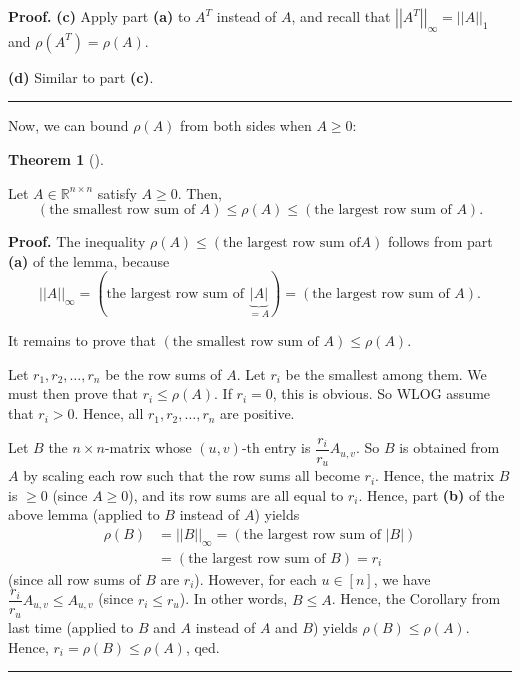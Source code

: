 \documentclass[numbers=enddot,12pt,final,onecolumn,notitlepage]{scrartcl}%
\numberwithin{exer}{subsection}
\theoremstyle{definition}
\newtheorem{theo}{Theorem}[subsection]
\newenvironment{theorem}[1][]
{\begin{theo}[#1]\begin{leftbar}}
{\end{leftbar}\end{theo}}
\newenvironment{proof}[1][Proof]{\noindent\textbf{#1.} }{\ \rule{0.5em}{0.5em}}
\begin{document}
\begin{proof}
\textbf{(c)} Apply part \textbf{(a)} to $A^{T}$ instead of $A$, and recall
that $\left\vert \left\vert A^{T}\right\vert \right\vert _{\infty}=\left\vert
\left\vert A\right\vert \right\vert _{1}$ and $\rho\left(  A^{T}\right)
=\rho\left(  A\right)  $.

\textbf{(d)} Similar to part \textbf{(c)}.
\end{proof}

Now, we can bound $\rho\left(  A\right)  $ from both sides when $A\geq0$:

\begin{theorem}
Let $A\in\mathbb{R}^{n\times n}$ satisfy $A\geq0$. Then,%
\[
\left(  \text{the smallest row sum of }A\right)  \leq\rho\left(  A\right)
\leq\left(  \text{the largest row sum of }A\right)  .
\]

\end{theorem}

\begin{proof}
The inequality $\rho\left(  A\right)  \leq\left(  \text{the largest row sum of
}A\right)  $ follows from part \textbf{(a)} of the lemma, because
\[
\left\vert \left\vert A\right\vert \right\vert _{\infty}=\left(  \text{the
largest row sum of }\underbrace{\left\vert A\right\vert }_{=A}\right)
=\left(  \text{the largest row sum of }A\right)  .
\]


It remains to prove that $\left(  \text{the smallest row sum of }A\right)
\leq\rho\left(  A\right)  $.

Let $r_{1},r_{2},\ldots,r_{n}$ be the row sums of $A$. Let $r_{i}$ be the
smallest among them. We must then prove that $r_{i}\leq\rho\left(  A\right)
$. If $r_{i}=0$, this is obvious. So WLOG assume that $r_{i}>0$. Hence, all
$r_{1},r_{2},\ldots,r_{n}$ are positive.

Let $B$ the $n\times n$-matrix whose $\left(  u,v\right)  $-th entry is
$\dfrac{r_{i}}{r_{u}}A_{u,v}$. So $B$ is obtained from $A$ by scaling each row
such that the row sums all become $r_{i}$. Hence, the matrix $B$ is $\geq0$
(since $A\geq0$), and its row sums are all equal to $r_{i}$. Hence, part
\textbf{(b)} of the above lemma (applied to $B$ instead of $A$) yields
\begin{align*}
\rho\left(  B\right)    & =\left\vert \left\vert B\right\vert \right\vert
_{\infty}=\left(  \text{the largest row sum of }\left\vert B\right\vert
\right)  \\
& =\left(  \text{the largest row sum of }B\right)  =r_{i}%
\end{align*}
(since all row sums of $B$ are $r_{i}$). However, for each $u\in\left[
n\right]  $, we have $\dfrac{r_{i}}{r_{u}}A_{u,v}\leq A_{u,v}$ (since
$r_{i}\leq r_{u}$). In other words, $B\leq A$. Hence, the Corollary from last
time (applied to $B$ and $A$ instead of $A$ and $B$) yields $\rho\left(
B\right)  \leq\rho\left(  A\right)  $. Hence, $r_{i}=\rho\left(  B\right)
\leq\rho\left(  A\right)  $, qed.
\end{proof}
\end{document}
